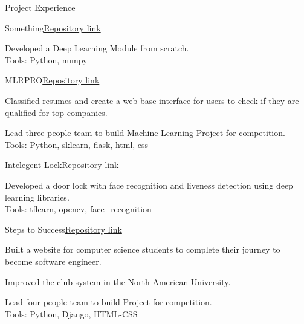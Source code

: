 \documentclass[10pt]{resume} %
\begin{document}
\begin{rSection}{Project Experience}
\begin{rSubsection}{Something}{\href{https://github.com/AhmetHamzaEmra/Something}{Repository link}}{}{}
\item Developed a Deep Learning Module from scratch.
\\ Tools: Python, numpy

\end{rSubsection}

\begin{rSubsection}{MLRPRO}{\href{https://github.com/AhmetHamzaEmra/MLRPRO}{Repository link}}{}{}
\item Classified resumes and create a web base interface for users to check if they are qualified for top companies.
\item Lead three people team to build Machine Learning Project for competition.
\\ Tools: Python, sklearn, flask, html, css

\end{rSubsection}



\begin{rSubsection}{Intelegent Lock}{\href{https://github.com/AhmetHamzaEmra/Intelegent_Lock}{Repository link}}{}{}
\item Developed a door lock with face recognition and liveness detection using deep learning libraries.
\\ Tools: tflearn, opencv, face\_recognition
\end{rSubsection}



\begin{rSubsection}{Steps to Success}{\href{https://github.com/AhmetHamzaEmra/StepsToSuccess}{Repository link}}{}{}
\item Built a website for computer science students to complete their journey to become software engineer.
\item Improved the club system in the North American University. 
\item Lead four people team to build Project for competition.
\\ Tools: Python, Django, HTML-CSS
\end{rSubsection}


\end{rSection}
\end{document}
